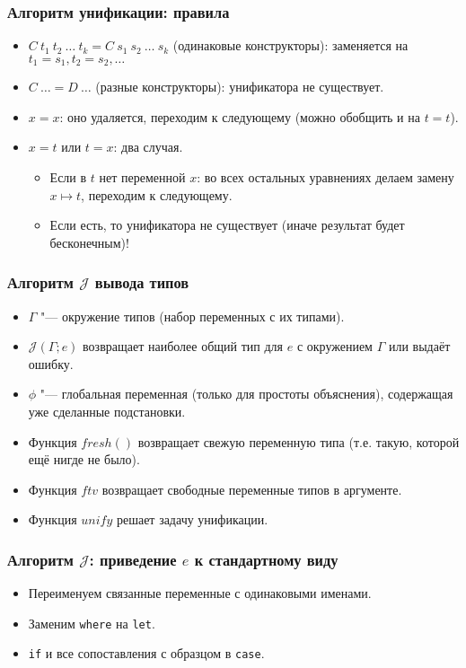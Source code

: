 \documentclass[11pt]{beamer}
\begin{document}
\begin{frame}[fragile]
  \frametitle{Алгоритм унификации: правила}
  \begin{itemize}
    \item $C~t_1~t_2~\ldots~t_k = C~s_1~s_2~\ldots~s_k$ (одинаковые конструкторы): \pause заменяется на $t_1 = s_1, t_2 = s_2, \ldots$
          \pause
    \item $C~\ldots = D~\ldots$ (разные конструкторы): \pause унификатора не существует.
          \pause
    \item $x=x$: \pause оно удаляется, переходим к следующему (можно обобщить и на $t=t$).
          \pause
    \item $x=t$ или $t=x$: два случая. \pause
          \begin{itemize}
            \item Если в $t$ нет переменной $x$: \pause во всех остальных уравнениях делаем замену $x \mapsto t$, переходим к следующему.
            \item Если есть\pause, то унификатора не существует (иначе результат будет бесконечным)!
          \end{itemize}
  \end{itemize}
\end{frame}

\newcommand{\fresh}{\mathord{\mathit{fresh}}()}
\newcommand{\J}{\mathcal{J}}
\begin{frame}[fragile]
  \frametitle{Алгоритм $\J$ вывода типов}
  \begin{itemize}
    \item $\Gamma$ "--- окружение типов (набор переменных с их типами).
    \item $\J(\Gamma; e)$ возвращает наиболее общий тип для $e$ с окружением $\Gamma$ или выдаёт ошибку.
          \pause
          \vspace{1em}
    \item $\phi$ "--- глобальная переменная (только для простоты объяснения), содержащая уже сделанные подстановки.
    \item Функция $\fresh$ возвращает свежую переменную типа (т.е. такую, которой ещё нигде не было).
    \item Функция $ftv$ возвращает свободные переменные типов в аргументе.
    \item Функция $unify$ решает задачу унификации.
  \end{itemize}
\end{frame}

\begin{frame}[fragile]
  \frametitle{Алгоритм $\J$: приведение $e$ к стандартному виду}
  \begin{itemize}
    \item Переименуем связанные переменные с одинаковыми именами.
    \item Заменим \lstinline|where| на \lstinline|let|.
    \item \lstinline|if| и все сопоставления с образцом в \lstinline|case|.
  \end{itemize}
\end{frame}
\end{document}
